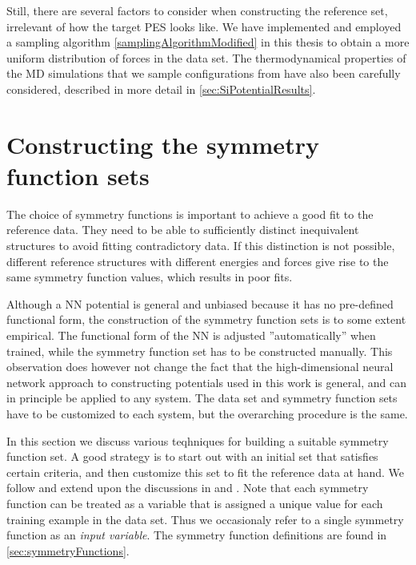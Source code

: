 \documentclass[twoside,english]{uiofysmaster}
\begin{document}
Still, there are several factors to consider when constructing the reference set, irrelevant of how the target PES looks like.  
We have implemented and employed a sampling algorithm \eqref{samplingAlgorithmModified} in this thesis to obtain a more uniform
distribution of forces in the data set. The thermodynamical properties of the MD simulations that we sample configurations 
from have also been carefully considered, described in more detail in \autoref{sec:SiPotentialResults}.  



\section{Constructing the symmetry function sets} \label{sec:constructingSymmetry}
The choice of symmetry functions is important to achieve a good fit to the reference data. 
They need to be able to sufficiently distinct inequivalent structures to avoid fitting 
contradictory data. If this distinction is not possible, different reference structures with 
different energies and forces give rise to the same symmetry function values, which results in poor fits. 

Although a NN potential is general and unbiased because it has no pre-defined functional form, the 
construction of the symmetry function sets is to some extent empirical. The functional form of the NN
is adjusted ''automatically'' when trained, while the symmetry function set has to be constructed manually.
This observation does however not change the fact that the high-dimensional neural network approach to
constructing potentials used in this work is general, and can in principle be applied to any system. The data set
and symmetry function sets have to be customized to each system, but the overarching procedure is the same. 

In this section we discuss various teqhniques for building a suitable symmetry function set. 
A good strategy is to start out with an initial set that satisfies certain criteria, and then customize this set to 
fit the reference data at hand. We follow and extend upon the discussions in \cite{Behler11symmetry} and \cite{Behler15}. 
Note that each symmetry function 
can be treated as a variable that is assigned a unique value for each training example in the data set. 
Thus we occasionaly refer to a single symmetry function as an \textit{input variable}. The symmetry function definitions 
are found in \autoref{sec:symmetryFunctions}. 
\end{document}
